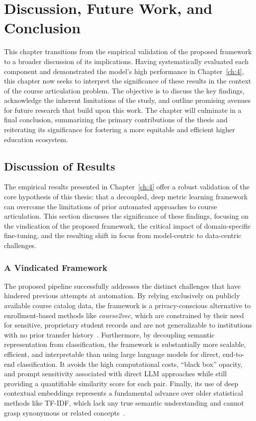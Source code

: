\chapter{Discussion, Future Work, and Conclusion}
This chapter transitions from the empirical validation of the proposed framework to a broader discussion of its implications. Having systematically evaluated each component and demonstrated the model's high performance in Chapter~\ref{ch:4}, this chapter now seeks to interpret the significance of these results in the context of the course articulation problem. The objective is to discuss the key findings, acknowledge the inherent limitations of the study, and outline promising avenues for future research that build upon this work. The chapter will culminate in a final conclusion, summarizing the primary contributions of the thesis and reiterating its significance for fostering a more equitable and efficient higher education ecosystem.

\section{Discussion of Results}\label{ch:5.1}
The empirical results presented in Chapter~\ref{ch:4} offer a robust validation of the core hypothesis of this thesis: that a decoupled, deep metric learning framework can overcome the limitations of prior automated approaches to course articulation. This section discusses the significance of these findings, focusing on the vindication of the proposed framework, the critical impact of domain-specific fine-tuning, and the resulting shift in focus from model-centric to data-centric challenges.

\subsection{A Vindicated Framework}\label{ch:5.1.1}
The proposed pipeline successfully addresses the distinct challenges that have hindered previous attempts at automation. By relying exclusively on publicly available course catalog data, the framework is a privacy-conscious alternative to enrollment-based methods like \emph{course2vec}, which are constrained by their need for sensitive, proprietary student records and are not generalizable to institutions with no prior transfer history~\cite{PardosCourse2Vec2019, slade10.1177/0002764213479366}. Furthermore, by decoupling semantic representation from classification, the framework is substantially more scalable, efficient, and interpretable than using large language models for direct, end-to-end classification. It avoids the high computational costs, ``black box'' opacity, and prompt sensitivity associated with direct LLM approaches while still providing a quantifiable similarity score for each pair. Finally, its use of deep contextual embeddings represents a fundamental advance over older statistical methods like TF-IDF, which lack any true semantic understanding and cannot grasp synonymous or related concepts~\cite{AIZAWA200345}.

